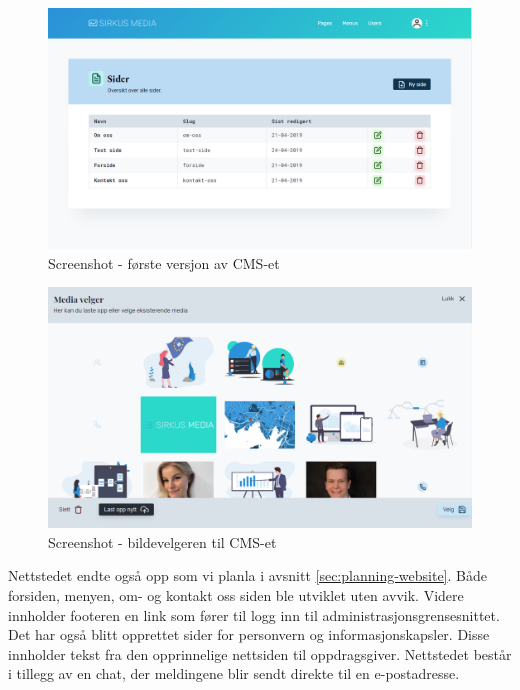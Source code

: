 \begin{figure}[H]
    \centering
    \includegraphics[width=\textwidth]{first-version-cms.png}
    \caption{Screenshot - første versjon av CMS-et}
    \label{fig:first-version-cms}
\end{figure}

\begin{figure}[H]
    \centering
    \includegraphics[width=\textwidth]{brukerveiledning/media-picker.png}
    \caption{Screenshot - bildevelgeren til CMS-et}
    \label{fig:media-picker-cms}
\end{figure}

Nettstedet endte også opp som vi planla i avsnitt \ref{sec:planning-website}. Både forsiden, menyen, om- og kontakt oss siden ble utviklet uten avvik. Videre innholder footeren en link som fører til logg inn til administrasjonsgrensesnittet. Det har også blitt opprettet sider for personvern og informasjonskapsler. Disse innholder tekst fra den opprinnelige nettsiden til oppdragsgiver. Nettstedet består i tillegg av en chat, der meldingene blir sendt direkte til en e-postadresse.

